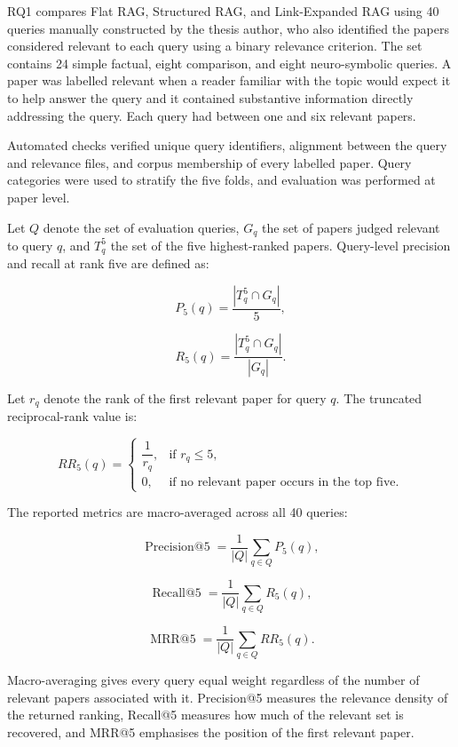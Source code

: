 \documentclass[runningheads]{llncs}
\begin{document}
RQ1 compares Flat RAG, Structured RAG, and Link-Expanded RAG using 40 queries
manually constructed by the thesis author, who also identified the
papers considered relevant to each query using a binary relevance
criterion. The set contains 24 simple factual, eight comparison, and
eight neuro-symbolic queries. A paper was labelled relevant when a
reader familiar with the topic would expect it to help answer the query
and it contained substantive information directly addressing the query.
Each query had between one and six relevant papers.

Automated checks verified unique query identifiers, alignment between
the query and relevance files, and corpus membership of every labelled
paper. Query categories were used to stratify the five folds, and
evaluation was performed at paper level.



Let \(Q\) denote the set of evaluation queries, \(G_q\) the set of
papers judged relevant to query \(q\), and \(T_q^5\) the set of the five
highest-ranked papers. Query-level precision and recall at rank five are
defined as:

\[
P_5(q)
=
\frac{
    \left|T_q^5 \cap G_q\right|
}{5},
\]

\[
R_5(q)
=
\frac{
    \left|T_q^5 \cap G_q\right|
}{
    \left|G_q\right|
}.
\]

Let \(r_q\) denote the rank of the first relevant paper for query \(q\).
The truncated reciprocal-rank value is:

\[
RR_5(q)
=
\begin{cases}
\dfrac{1}{r_q},
& \text{if } r_q \leq 5,\\[0.8em]
0,
& \text{if no relevant paper occurs in the top five.}
\end{cases}
\]

The reported metrics are macro-averaged across all 40 queries:

\[
\operatorname{Precision@5}
=
\frac{1}{|Q|}
\sum_{q\in Q}P_5(q),
\]

\[
\operatorname{Recall@5}
=
\frac{1}{|Q|}
\sum_{q\in Q}R_5(q),
\]

\[
\operatorname{MRR@5}
=
\frac{1}{|Q|}
\sum_{q\in Q}RR_5(q).
\]

Macro-averaging gives every query equal weight regardless of the number
of relevant papers associated with it. Precision@5 measures the
relevance density of the returned ranking, Recall@5 measures how much
of the relevant set is recovered, and MRR@5 emphasises the position of
the first relevant paper.
\end{document}
